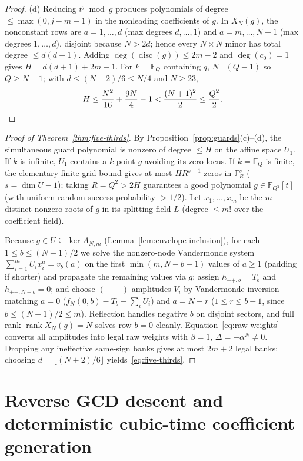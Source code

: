 \documentclass[11pt,reqno]{amsart}
\numberwithin{equation}{section}
\theoremstyle{definition}
\theoremstyle{remark}
\newcommand{\F}{\mathbb{F}}
\newcommand{\rank}{\operatorname{rank}}
\newcommand{\disc}{\operatorname{disc}}
\begin{document}
\begin{proof}
(d) Reducing $t^j\bmod g$ produces polynomials of degree $\le\max(0,j-m+1)$ in the nonleading coefficients of $g$. In $X_N(g)$, the nonconstant rows are $a=1,\ldots,d$ (max degrees $d,\ldots,1$) and $a=m,\ldots,N-1$ (max degrees $1,\ldots,d$), disjoint because $N>2d$; hence every $N\times N$ minor has total degree $\le d(d+1)$. Adding $\deg(\disc(g))\le 2m-2$ and $\deg(c_0)=1$ gives $H=d(d+1)+2m-1$. For $k=\F_Q$ containing $q$, $N\mid (Q-1)$ so $Q\ge N+1$; with $d\le (N+2)/6\le N/4$ and $N\ge 23$,
\[
H \le \frac{N^2}{16} + \frac{9N}{4} - 1 < \frac{(N+1)^2}{2} \le \frac{Q^2}{2}. \qedhere
\]
\end{proof}

\begin{proof}[Proof of Theorem~\ref{thm:five-thirds}]
By Proposition~\ref{prop:guards}(c)--(d), the simultaneous guard polynomial is nonzero of degree $\le H$ on the affine space $U_1$. If $k$ is infinite, $U_1$ contains a $k$-point $g$ avoiding its zero locus. If $k=\F_Q$ is finite, the elementary finite-grid bound gives at most $H R^{s-1}$ zeros in $\F_R^s$ ($s=\dim U-1$); taking $R=Q^2>2H$ guarantees a good polynomial $g\in\F_{Q^2}[t]$ (with uniform random success probability $>1/2$). Let $x_1,\ldots,x_m$ be the $m$ distinct nonzero roots of $g$ in its splitting field $L$ (degree $\le m!$ over the coefficient field).

Because $g\in U\subseteq\ker A_{N,m}$ (Lemma~\ref{lem:envelope-inclusion}), for each $1\le b\le (N-1)/2$ we solve the nonzero-node Vandermonde system $\sum_{i=1}^m U_i x_i^a = v_b(a)$ on the first $\min(m,N-b-1)$ values of $a\ge 1$ (padding if shorter) and propagate the remaining values via $g$; assign $h_{-+,b}=T_b$ and $h_{+-,N-b}=0$; and choose $(--)$ amplitudes $V_i$ by Vandermonde inversion matching $a=0$ ($f_N(0,b)-T_b-\sum_i U_i$) and $a=N-r$ ($1\le r\le b-1$, since $b\le (N-1)/2\le m$). Reflection handles negative $b$ on disjoint sectors, and full rank $\rank X_N(g)=N$ solves row $b=0$ cleanly. Equation~\eqref{eq:raw-weights} converts all amplitudes into legal raw weights with $\beta=1$, $\Delta=-\alpha^N\ne 0$. Dropping any ineffective same-sign banks gives at most $2m+2$ legal banks; choosing $d=\lfloor(N+2)/6\rfloor$ yields~\eqref{eq:five-thirds}.
\end{proof}

\section{Reverse GCD descent and deterministic cubic-time coefficient generation}
\label{sec:cubic}
\end{document}
